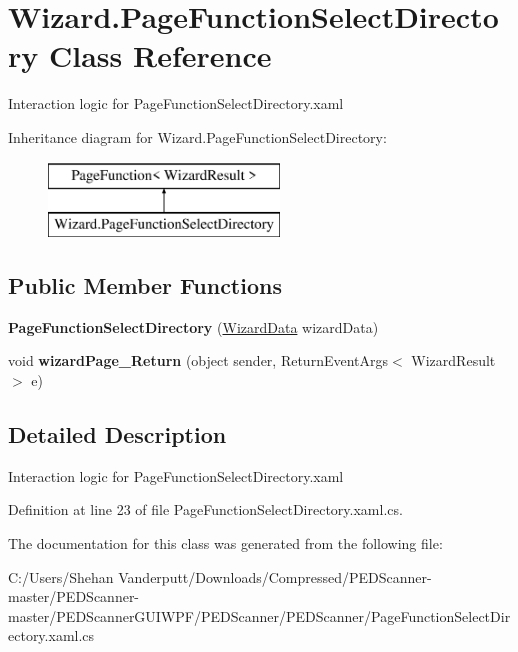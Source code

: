 \hypertarget{class_wizard_1_1_page_function_select_directory}{}\section{Wizard.\+Page\+Function\+Select\+Directory Class Reference}
\label{class_wizard_1_1_page_function_select_directory}


Interaction logic for Page\+Function\+Select\+Directory.\+xaml  


Inheritance diagram for Wizard.\+Page\+Function\+Select\+Directory\+:\begin{figure}[H]
\begin{center}
\leavevmode
\includegraphics[height=2.000000cm]{class_wizard_1_1_page_function_select_directory}
\end{center}
\end{figure}
\subsection*{Public Member Functions}
\begin{DoxyCompactItemize}
\item 
\mbox{\label{class_wizard_1_1_page_function_select_directory_aa0ff7c84ecd72f8b8804737cb10f6921}} 
{\bfseries Page\+Function\+Select\+Directory} (\mbox{\hyperlink{class_wizard_1_1_wizard_data}{Wizard\+Data}} wizard\+Data)
\item 
\mbox{\label{class_wizard_1_1_page_function_select_directory_ac620158dee28731a79fedd511aa6b33a}} 
void {\bfseries wizard\+Page\+\_\+\+Return} (object sender, Return\+Event\+Args$<$ Wizard\+Result $>$ e)
\end{DoxyCompactItemize}


\subsection{Detailed Description}
Interaction logic for Page\+Function\+Select\+Directory.\+xaml 



Definition at line 23 of file Page\+Function\+Select\+Directory.\+xaml.\+cs.



The documentation for this class was generated from the following file\+:\begin{DoxyCompactItemize}
\item 
C\+:/\+Users/\+Shehan Vanderputt/\+Downloads/\+Compressed/\+P\+E\+D\+Scanner-\/master/\+P\+E\+D\+Scanner-\/master/\+P\+E\+D\+Scanner\+G\+U\+I\+W\+P\+F/\+P\+E\+D\+Scanner/\+P\+E\+D\+Scanner/Page\+Function\+Select\+Directory.\+xaml.\+cs\end{DoxyCompactItemize}
